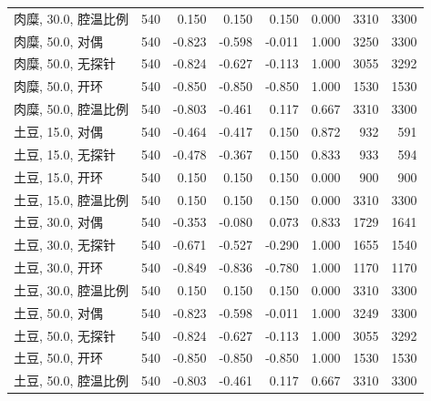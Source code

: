 \begin{longtable}{lrrrrrrr}
肉糜, 30.0, 腔温比例 & 540 & 0.150 & 0.150 & 0.150 & 0.000 & 3310 & 3300 \\
肉糜, 50.0, 对偶 & 540 & -0.823 & -0.598 & -0.011 & 1.000 & 3250 & 3300 \\
肉糜, 50.0, 无探针 & 540 & -0.824 & -0.627 & -0.113 & 1.000 & 3055 & 3292 \\
肉糜, 50.0, 开环 & 540 & -0.850 & -0.850 & -0.850 & 1.000 & 1530 & 1530 \\
肉糜, 50.0, 腔温比例 & 540 & -0.803 & -0.461 & 0.117 & 0.667 & 3310 & 3300 \\
土豆, 15.0, 对偶 & 540 & -0.464 & -0.417 & 0.150 & 0.872 & 932 & 591 \\
土豆, 15.0, 无探针 & 540 & -0.478 & -0.367 & 0.150 & 0.833 & 933 & 594 \\
土豆, 15.0, 开环 & 540 & 0.150 & 0.150 & 0.150 & 0.000 & 900 & 900 \\
土豆, 15.0, 腔温比例 & 540 & 0.150 & 0.150 & 0.150 & 0.000 & 3310 & 3300 \\
土豆, 30.0, 对偶 & 540 & -0.353 & -0.080 & 0.073 & 0.833 & 1729 & 1641 \\
土豆, 30.0, 无探针 & 540 & -0.671 & -0.527 & -0.290 & 1.000 & 1655 & 1540 \\
土豆, 30.0, 开环 & 540 & -0.849 & -0.836 & -0.780 & 1.000 & 1170 & 1170 \\
土豆, 30.0, 腔温比例 & 540 & 0.150 & 0.150 & 0.150 & 0.000 & 3310 & 3300 \\
土豆, 50.0, 对偶 & 540 & -0.823 & -0.598 & -0.011 & 1.000 & 3249 & 3300 \\
土豆, 50.0, 无探针 & 540 & -0.824 & -0.627 & -0.113 & 1.000 & 3055 & 3292 \\
土豆, 50.0, 开环 & 540 & -0.850 & -0.850 & -0.850 & 1.000 & 1530 & 1530 \\
土豆, 50.0, 腔温比例 & 540 & -0.803 & -0.461 & 0.117 & 0.667 & 3310 & 3300 \\
\bottomrule
\end{longtable}

